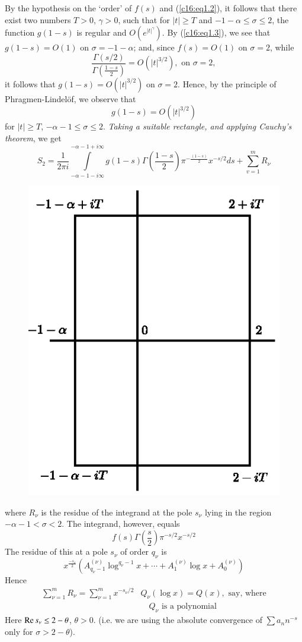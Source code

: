By the hypothesis on the `order' of $f(s)$ and (\ref{c16:eq1.2}), it follows that
there exist two numbers $T>0$, $\gamma>0$, such that for $|t| \geq T$
and $-1 - \alpha \leq \sigma \leq 2$, the function $g(1-s)$ is regular
and $O(e^{|t|^\gamma})$. By (\ref{c16:eq1.3}), we see that $g(1-s) = O (1)$ on
$\sigma =-1 - \alpha$; and, since $f(s) = O(1)$ on $\sigma =2$, while 
$$
\frac{\Gamma(s/2)}{\Gamma(\frac{1-s}{2})} = O (|t|^{3/2}), \text{ on }
\sigma =2, 
$$
it follows that $g(1-s) = O (|t|^{3/2})$ on $\sigma =2$. Hence, by the
principle of Phragmen-Lindel\"of, we observe that
$$
g(1-s) = O (|t|^{3/2})
$$
for $|t| \geq T$, $-\alpha -1 \leq \sigma \leq 2$. \textit{Taking a
  suitable rectangle, and applying Cauchy's theorem}, we get
$$
S_2 = \frac{1}{2\pi i} \int\limits^{-\alpha -1+i\infty}_{-\alpha -1-i
  \infty} g(1-s) \Gamma\left(\frac{1-s}{2} \right)
\pi^{-\frac{(1-s)}{2}} x^{-s/2} ds + \sum\limits^{m}_{v=1} R_\nu
$$
\begin{figure}[H]
\centering
\includegraphics{figures/fig16.1.eps}
\end{figure}

\noindent
where $R_\nu$ is the residue of the integrand at the pole $s_\nu$
lying in the region\pageoriginale $-\alpha -1 < \sigma < 2$. The
integrand, however, equals
$$
f(s) \Gamma\left(\frac{s}{2} \right) \pi^{-s/2} x^{-s/2} 
$$
The residue of this at a pole $s_\nu$ of order $q_{\nu}$ is 
$$ 
x^{\frac{-s_\nu}{2}} \left(A^{(\nu)}_{q_\nu-1} \log^{q_\nu-1} x + \cdots +
A^{(\nu)}_1 \log x + A^{(\nu)}_0\right)
$$
Hence
\begin{align*}
\sum^m_{\nu=1} R_\nu = \sum^m_{\nu=1} x^{-s_\nu/2} & Q_\nu (\log x) =
Q(x), \text{ say, where}\\
& \quad Q_\nu \text{ is a polynomial}
\end{align*}
Here $\operatorname{Re} s_\nu \leq 2 - \theta$, $\theta >0$. (i.e. we are using the
absolute convergence of $\sum a_n n^{-s}$ only for $\sigma > 2 - \theta$).

